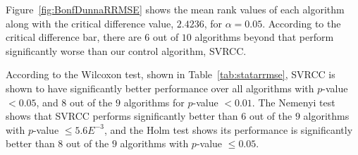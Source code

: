 \documentclass[reqno]{vcuthesis}
\numberwithin{equation}{chapter}
\begin{document}
Figure~{\ref{fig:BonfDunnaRRMSE}} shows the mean rank values of each algorithm along with the critical difference value, $2.4236$, for $\alpha = 0.05$. According to the critical difference bar, there are $6$ out of $10$ algorithms beyond that perform significantly worse than our control algorithm, SVRCC.

According to the Wilcoxon test, shown in Table~{\ref{tab:statarrmse}}, SVRCC is shown to have significantly better performance over all algorithms with $p$-value $< 0.05$, and $8$ out of the $9$ algorithms for $p$-value $< 0.01$. The Nemenyi test shows that SVRCC performs significantly better than $6$ out of the $9$ algorithms with $p$-value $\leq 5.6E^{-3}$, and the Holm test shows its performance is significantly better than $8$ out of the $9$ algorithms with $p$-value $\leq 0.05$.
\end{document}
